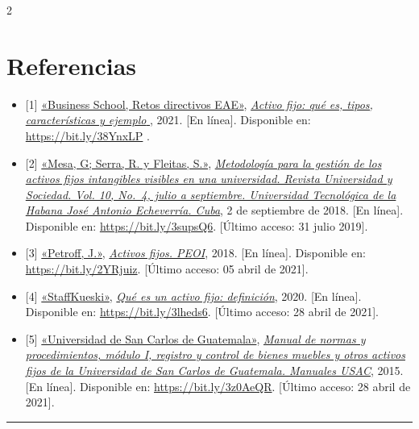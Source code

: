 \documentclass[12pt,spanish,Letterpaper,openany]{book}
\newcommand{\HRule}{\begin{center}\rule{0.5\linewidth}{0.2mm}\end{center}}
\begin{document}
\begin {multicols}{2}
\hypertarget{referencias-6}{%
\section{Referencias}\label{referencias-6}}

\begin{itemize}
\item
  {[}1{]} \href{https://retos-directivos.eae.es/}{«Business School, Retos directivos EAE»}, \href{https://retos-directivos.eae.es/el-activo-fijo-tipos-y-caracteristicas/}{\emph{Activo fijo: qué es, tipos, características y ejemplo }}, 2021. {[}En línea{]}. Disponible en: \url{https://bit.ly/38YnxLP} .
\item
  {[}2{]} \href{http://scielo.sld.cu/}{«Mesa, G; Serra, R. y Fleitas, S.»}, \href{http://scielo.sld.cu/scielo.php?script=sci_arttext\&pid=S2218-36202018000400154}{\emph{Metodología para la gestión de los activos fijos intangibles visibles en una universidad. Revista Universidad y Sociedad. Vol. 10, No.~4, julio a septiembre. Universidad Tecnológica de la Habana José Antonio Echeverría. Cuba}}, 2 de septiembre de 2018. {[}En línea{]}. Disponible en: \url{https://bit.ly/3supsQ6}. {[}Último acceso: 31 julio 2019{]}.
\item
  {[}3{]} \href{https://www.peoi.org/}{«Petroff, J.»}, \href{https://www.peoi.org/Courses/Coursessp/ac/fram11.html}{\emph{Activos fijos. PEOI}}, 2018. {[}En línea{]}. Disponible en: \url{https://bit.ly/2YRjuiz}. {[}Último acceso: 05 abril de 2021{]}.
\item
  {[}4{]} \href{https://kueski.com}{«StaffKueski»}, \href{https://kueski.com/blog/finanzas-personales/jovenes-emprendedores\%20/que-es-un-activo-fijo/.}{\emph{Qué es un activo fijo: definición}}, 2020. {[}En línea{]}. Disponible en: \url{https://bit.ly/3lheds6}. {[}Último acceso: 28 abril de 2021{]}.
\item
  {[}5{]} \href{https://manuales.\%20usac.edu.gt}{«Universidad de San Carlos de Guatemala»}, \href{https://manuales.usac.edu.gt/wp-content/uploads/2015/05/manualesModuloI14-07-10.pdf}{\emph{Manual de normas y procedimientos, módulo I, registro y control de bienes muebles y otros activos fijos de la Universidad de San Carlos de Guatemala. Manuales USAC}}, 2015. {[}En línea{]}. Disponible en: \url{https://bit.ly/3z0AeQR}. {[}Último acceso: 28 abril de 2021{]}.
\end{itemize}

\end {multicols}

\medskip

\HRule

\medskip







\end{document}
